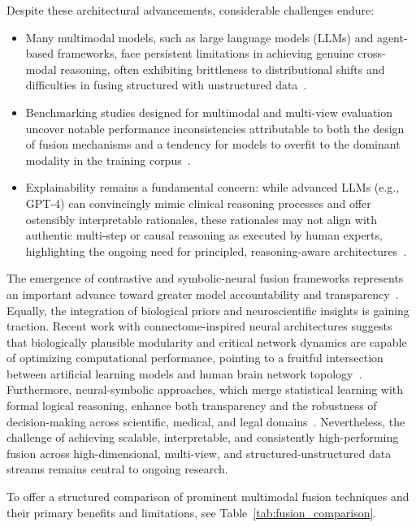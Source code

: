 \documentclass[sigconf]{acmart}
\begin{document}
Despite these architectural advancements, considerable challenges endure:
\begin{itemize}
    \item Many multimodal models, such as large language models (LLMs) and agent-based frameworks, face persistent limitations in achieving genuine cross-modal reasoning, often exhibiting brittleness to distributional shifts and difficulties in fusing structured with unstructured data~\cite{ref36,ref46,ref49,ref60,ref74,ref90}.
    \item Benchmarking studies designed for multimodal and multi-view evaluation uncover notable performance inconsistencies attributable to both the design of fusion mechanisms and a tendency for models to overfit to the dominant modality in the training corpus~\cite{ref31,ref74,ref80,ref87,ref88}.
    \item Explainability remains a fundamental concern: while advanced LLMs (e.g., GPT-4) can convincingly mimic clinical reasoning processes and offer ostensibly interpretable rationales, these rationales may not align with authentic multi-step or causal reasoning as executed by human experts, highlighting the ongoing need for principled, reasoning-aware architectures~\cite{ref31,ref36,ref49,ref55,ref89}.
\end{itemize}

The emergence of contrastive and symbolic-neural fusion frameworks represents an important advance toward greater model accountability and transparency~\cite{ref46,ref47,ref48,ref50,ref88}. Equally, the integration of biological priors and neuroscientific insights is gaining traction. Recent work with connectome-inspired neural architectures suggests that biologically plausible modularity and critical network dynamics are capable of optimizing computational performance, pointing to a fruitful intersection between artificial learning models and human brain network topology~\cite{ref90}. Furthermore, neural-symbolic approaches, which merge statistical learning with formal logical reasoning, enhance both transparency and the robustness of decision-making across scientific, medical, and legal domains~\cite{ref46,ref47,ref48,ref49,ref50}. Nevertheless, the challenge of achieving scalable, interpretable, and consistently high-performing fusion across high-dimensional, multi-view, and structured-unstructured data streams remains central to ongoing research.

To offer a structured comparison of prominent multimodal fusion techniques and their primary benefits and limitations, see Table~\ref{tab:fusion_comparison}.
\end{document}
